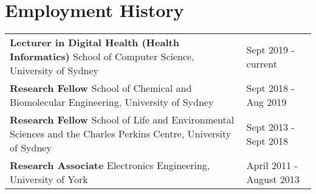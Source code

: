 \documentclass[a4paper]{article}
\begin{document}
\section*{Employment History}

\begin{tabular}{p{12cm}p{6cm}}


    \textbf{Lecturer in Digital Health (Health Informatics)}\newline
    School of Computer Science, University of Sydney
    \vspace{3mm}
    &
    Sept 2019 - current\\

    \textbf{Research Fellow}\newline
    School of Chemical and Biomolecular Engineering, University of Sydney
    \vspace{3mm}
    &
    Sept 2018 - Aug 2019\\


    \textbf{Research Fellow} \newline
    School of Life and Environmental Sciences and the Charles Perkins Centre, University of Sydney
    \vspace{3mm}
    &
    Sept 2013 - Sept 2018 \\

    \textbf{Research Associate} \newline
    Electronics Engineering, University of York
    &
    April 2011 - August 2013\\[2mm]
\end{tabular}


\end{document}
